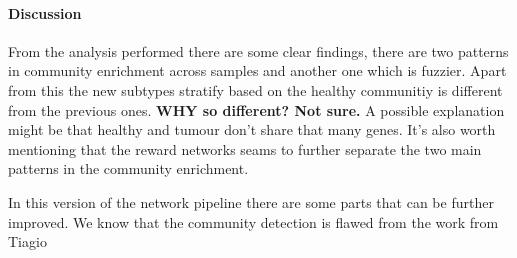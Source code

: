 \paragraph{Discussion}

From the analysis performed there are some clear findings, there are two patterns in community enrichment across samples and another one which is fuzzier. Apart from this the new subtypes stratify based on the healthy communitiy is different from the previous ones. \textbf{WHY so different? Not sure.} A possible explanation might be that healthy and tumour don't share that many genes. It's also worth mentioning that the reward networks seams to further separate the two main patterns in the community enrichment. 

In this version of the network pipeline there are some parts that can be further improved. We know that the community detection is flawed from the work from Tiagio \cite[]{TIago}

